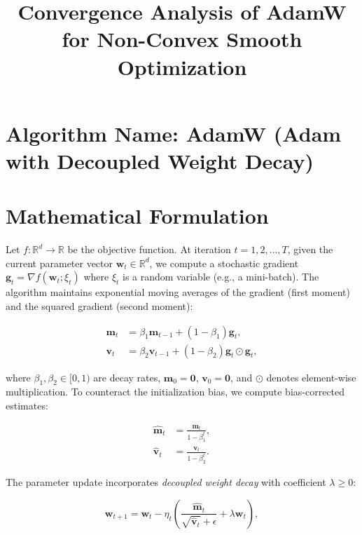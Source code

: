\documentclass{article}
\title{Convergence Analysis of AdamW for Non-Convex Smooth Optimization}
\author{}
\date{}
\theoremstyle{plain}
\theoremstyle{definition}
\renewcommand{\vec}[1]{\boldsymbol{#1}}
\newcommand{\R}{\mathbb{R}}
\begin{document}
\maketitle

\section*{Algorithm Name: AdamW (Adam with Decoupled Weight Decay)}

\section*{Mathematical Formulation}

Let $f: \R^d \to \R$ be the objective function. At iteration $t = 1, 2, \dots, T$, given the current parameter vector $\vec{w}_t \in \R^d$, we compute a stochastic gradient $\vec{g}_t = \nabla f(\vec{w}_t; \xi_t)$ where $\xi_t$ is a random variable (e.g., a mini-batch). The algorithm maintains exponential moving averages of the gradient (first moment) and the squared gradient (second moment):

\begin{align}
    \vec{m}_t &= \beta_1 \vec{m}_{t-1} + (1 - \beta_1) \vec{g}_t, \label{eq:m_update} \\
    \vec{v}_t &= \beta_2 \vec{v}_{t-1} + (1 - \beta_2) \vec{g}_t \odot \vec{g}_t, \label{eq:v_update}
\end{align}

where $\beta_1, \beta_2 \in [0,1)$ are decay rates, $\vec{m}_0 = \vec{0}$, $\vec{v}_0 = \vec{0}$, and $\odot$ denotes element-wise multiplication. To counteract the initialization bias, we compute bias-corrected estimates:

\begin{align}
    \hat{\vec{m}}_t &= \frac{\vec{m}_t}{1 - \beta_1^t}, \label{eq:m_hat} \\
    \hat{\vec{v}}_t &= \frac{\vec{v}_t}{1 - \beta_2^t}. \label{eq:v_hat}
\end{align}

The parameter update incorporates \textit{decoupled weight decay} with coefficient $\lambda \ge 0$:

\begin{equation}
    \vec{w}_{t+1} = \vec{w}_t - \eta_t \left( \frac{\hat{\vec{m}}_t}{\sqrt{\hat{\vec{v}}_t} + \epsilon} + \lambda \vec{w}_t \right), \label{eq:update}
\end{equation}
\end{document}
